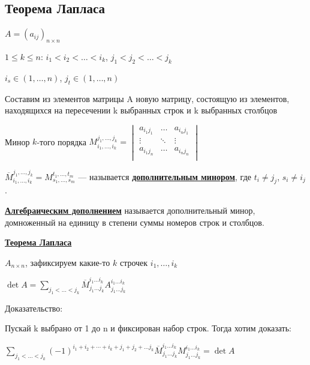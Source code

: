 \documentclass[twoside]{book}
\newcommand{\deff}[1]{\underline{\textbf{#1}}}
\newcommand{\thmm}[1]{\underline{\textbf{#1}}}
\begin{document}
\subsection{Теорема Лапласа}

\(A =(a_{ij})_{n \times n}\)

\(1 \leq k \leq n\): \(i_1 < i_2 < \ldots < i_k\), \(j_1 < j_2 < \ldots < j_k\)

\(i_s \in (1, \ldots, n)\), \(j_t \in (1, \ldots, n)\)

Составим из элементов матрицы A новую матрицу, состоящую из элементов, находящихся на пересечении k выбранных строк и k выбранных столбцов

Минор \(k\)-того порядка \(M_{i_1, \ldots, i_k}^{j_1, \ldots, j_k} =
\begin{vmatrix}
    a_{i_1 j_1} & \ldots & a_{i_n j_1} \\
    \vdots      & \ddots & \vdots      \\
    a_{i_1 j_n} & \ldots & a_{i_n j_n} \\
\end{vmatrix}\)

\(\overline{M}_{i_1, \ldots, i_k}^{j_1, \ldots, j_k} = M_{s_1, \ldots, s_m}^{t_1, \ldots, t_m}\) --- называется \deff{дополнительным минором}, где $t_i \neq j_j$, $s_i\neq i_j$.

\deff{Алгебраическим дополнением} называется дополнительный минор, домноженный на единицу в степени суммы номеров строк и столбцов.

\thmm{Теорема Лапласа}

\(A_{n\times n }\), зафиксируем какие-то $k$ строчек $i_1,\ldots, i_k$

\(\det A = \sum\limits_{j_1<\ldots<j_k} \overline{M}_{j_1\ldots j_k}^{i_1\ldots i_k} A_{j_1\ldots j_k}^{i_1\ldots i_k}\)

Доказательство:

Пускай k выбрано от 1 до n и фиксирован набор строк. Тогда хотим доказать:

\(\sum\limits_{j_1<\ldots<j_k}(-1)^{i_1+i_2+ \cdots +i_k+ j_1 +j_2 + \ldots j_k} \overline{M}_{j_1\ldots j_k}^{i_1\ldots i_k} M_{j_1\ldots j_k}^{i_1\ldots i_k} = \det A\)
\end{document}
